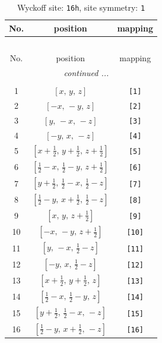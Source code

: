 \documentclass[fleqn,8pt]{jsarticle}
\begin{document}
\begin{longtable}{ccc}
\caption{Wyckoff site: {\tt 16h}, site symmetry: {\tt 1}}
 \\
 \hline \hline
No. & position & mapping \\ \hline \endfirsthead

\multicolumn{2}{l}{\tablename\ \thetable{}} \\
 \hline \hline
No. & position & mapping \\ \hline \endhead

 \hline \hline
\multicolumn{2}{r}{\footnotesize\it continued ...} \\ \endfoot

 \hline \hline
\multicolumn{2}{r}{} \\ \endlastfoot

1 & $\left[ x,\, y,\, z \right]$ & {\tt [1]} \\ \hline
2 & $\left[ - x,\, - y,\, z \right]$ & {\tt [2]} \\ \hline
3 & $\left[ y,\, - x,\, - z \right]$ & {\tt [3]} \\ \hline
4 & $\left[ - y,\, x,\, - z \right]$ & {\tt [4]} \\ \hline
5 & $\left[ x + \frac{1}{2},\, y + \frac{1}{2},\, z + \frac{1}{2} \right]$ & {\tt [5]} \\ \hline
6 & $\left[ \frac{1}{2} - x,\, \frac{1}{2} - y,\, z + \frac{1}{2} \right]$ & {\tt [6]} \\ \hline
7 & $\left[ y + \frac{1}{2},\, \frac{1}{2} - x,\, \frac{1}{2} - z \right]$ & {\tt [7]} \\ \hline
8 & $\left[ \frac{1}{2} - y,\, x + \frac{1}{2},\, \frac{1}{2} - z \right]$ & {\tt [8]} \\ \hline
9 & $\left[ x,\, y,\, z + \frac{1}{2} \right]$ & {\tt [9]} \\ \hline
10 & $\left[ - x,\, - y,\, z + \frac{1}{2} \right]$ & {\tt [10]} \\ \hline
11 & $\left[ y,\, - x,\, \frac{1}{2} - z \right]$ & {\tt [11]} \\ \hline
12 & $\left[ - y,\, x,\, \frac{1}{2} - z \right]$ & {\tt [12]} \\ \hline
13 & $\left[ x + \frac{1}{2},\, y + \frac{1}{2},\, z \right]$ & {\tt [13]} \\ \hline
14 & $\left[ \frac{1}{2} - x,\, \frac{1}{2} - y,\, z \right]$ & {\tt [14]} \\ \hline
15 & $\left[ y + \frac{1}{2},\, \frac{1}{2} - x,\, - z \right]$ & {\tt [15]} \\ \hline
16 & $\left[ \frac{1}{2} - y,\, x + \frac{1}{2},\, - z \right]$ & {\tt [16]} \\
\end{longtable}
\end{document}
